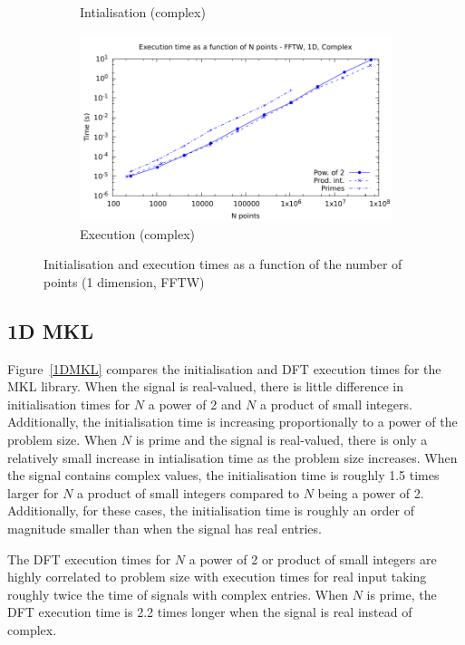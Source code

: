 \documentclass[12pt, a4paper]{article}
\begin{document}
\begin{figure}[htb]
\begin{subfigure}{.5\textwidth}
\caption{Intialisation (complex)}
\label{1DFFTWCI}
\end{subfigure}%
\begin{subfigure}{.5\textwidth}
\centering
\includegraphics[width=.9\linewidth]{graphs/1d-fftw-exec-c.pdf}
\caption{Execution (complex)}
\label{1DFFTWC}
\end{subfigure}
\caption{Initialisation and execution times as a function of the number of points (1 dimension, FFTW)}
\label{1DFFTW}
\end{figure}

\subsection{1D MKL}
Figure~\ref{1DMKL} compares the initialisation and DFT execution times for the MKL library. When the 
signal is real-valued, there is little difference in initialisation times for $N$ a power of 2 and $N$ 
a product of small integers. Additionally, the initialisation time is increasing proportionally to a 
power of the problem size. When $N$ is prime and the signal is real-valued, there is only a relatively 
small increase in intialisation time as the problem size increases. When the signal contains complex 
values, the initialisation time is roughly 1.5 times larger for $N$ a product of small integers 
compared to $N$ being a power of 2. Additionally, for these cases, the initialisation time is roughly 
an order of magnitude smaller than when the signal has real entries.

The DFT execution times for $N$ a power of 2 or product of small integers are highly correlated to 
problem size with execution times for real input taking roughly twice the time of signals with complex 
entries. When $N$ is prime, the DFT execution time is 2.2 times longer when the signal is real instead 
of complex.
\end{document}
